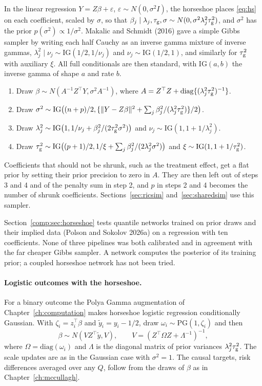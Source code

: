 In the linear regression $Y = Z\beta + \varepsilon$, $\varepsilon \sim N(0, \sigma^2 I)$, the horseshoe places \eqref{eq:hs} on each coefficient, scaled by $\sigma$, so that $\beta_j \mid \lambda_j, \tau_{\mathrm{g}}, \sigma \sim N(0, \sigma^2\lambda_j^2\tau_{\mathrm{g}}^2)$, and $\sigma^2$ has the prior $p(\sigma^2) \propto 1/\sigma^2$. Makalic and Schmidt (2016) gave a simple Gibbs sampler by writing each half Cauchy as an inverse gamma mixture of inverse gammas, $\lambda_j^2 \mid \nu_j \sim \mathrm{IG}(1/2, 1/\nu_j)$ and $\nu_j \sim \mathrm{IG}(1/2, 1)$, and similarly for $\tau_{\mathrm{g}}^2$ with auxiliary $\xi$. All full conditionals are then standard, with $\mathrm{IG}(a, b)$ the inverse gamma of shape $a$ and rate $b$.

\begin{enumerate}
\item Draw $\beta \sim N(A^{-1}Z^\top Y, \sigma^2 A^{-1})$, where $A = Z^\top Z + \mathrm{diag}\{(\lambda_j^2\tau_{\mathrm{g}}^2)^{-1}\}$.
\item Draw $\sigma^2 \sim \mathrm{IG}\bigl((n + p)/2, \{\|Y - Z\beta\|^2 + \sum_j \beta_j^2/(\lambda_j^2\tau_{\mathrm{g}}^2)\}/2\bigr)$.
\item Draw $\lambda_j^2 \sim \mathrm{IG}\bigl(1, 1/\nu_j + \beta_j^2/(2\tau_{\mathrm{g}}^2\sigma^2)\bigr)$ and $\nu_j \sim \mathrm{IG}(1, 1 + 1/\lambda_j^2)$.
\item Draw $\tau_{\mathrm{g}}^2 \sim \mathrm{IG}\bigl((p + 1)/2, 1/\xi + \sum_j \beta_j^2/(2\lambda_j^2\sigma^2)\bigr)$ and $\xi \sim \mathrm{IG}(1, 1 + 1/\tau_{\mathrm{g}}^2)$.
\end{enumerate}
Coefficients that should not be shrunk, such as the treatment effect, get a flat prior by setting their prior precision to zero in $A$. They are then left out of steps 3 and 4 and of the penalty sum in step 2, and $p$ in steps 2 and 4 becomes the number of shrunk coefficients. Sections~\ref{sec:ricsim} and~\ref{sec:sharedsim} use this sampler.

Section~\ref{comp:sec:horseshoe} tests quantile networks trained on prior draws and their implied data (Polson and Sokolov 2026a) on a regression with ten coefficients. None of three pipelines was both calibrated and in agreement with the far cheaper Gibbs sampler. A network computes the posterior of its training prior; a coupled horseshoe network has not been tried.

\paragraph{Logistic outcomes with the horseshoe.}
For a binary outcome the Polya Gamma augmentation of Chapter~\ref{ch:computation} makes horseshoe logistic regression conditionally Gaussian. With $\zeta_i = z_i^\top\beta$ and $\tilde y_i = y_i - 1/2$, draw $\omega_i \sim \mathrm{PG}(1, \zeta_i)$ and then
\[
\beta \sim N(V Z^\top\tilde y, V), \qquad V = (Z^\top\Omega Z + \Lambda^{-1})^{-1},
\]
where $\Omega = \mathrm{diag}(\omega_i)$ and $\Lambda$ is the diagonal matrix of prior variances $\lambda_j^2\tau_{\mathrm{g}}^2$. The scale updates are as in the Gaussian case with $\sigma^2 = 1$. The causal targets, risk differences averaged over any $Q$, follow from the draws of $\beta$ as in Chapter~\ref{ch:mccullagh}.


